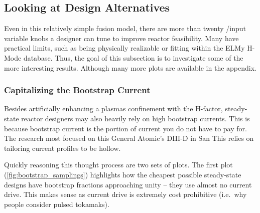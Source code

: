 \subsection{Looking at Design Alternatives}

Even in this relatively simple fusion model, there are more than twenty /input variable knobs a designer can tune to improve reactor feasibility. Many have practical limits, such as being physically realizable or fitting within the ELMy H-Mode database. Thus, the goal of this subsection is to investigate some of the more interesting results. Although many more plots are available in the appendix.

\subsubsection{Capitalizing the Bootstrap Current}

Besides artificially enhancing a plasmas confinement with the H-factor, steady-state reactor designers may also heavily rely on high bootstrap currents. This is because bootstrap current is the portion of current you do not have to pay for. The research  most focused on this  General Atomic's DIII-D in San  This  relies on tailoring current profiles to be  hollow.

Quickly reasoning this  thought process are two sets of plots. The first plot (\cref{fig:bootstrap_samplings}) highlights how the cheapest possible steady-state designs have bootstrap fractions approaching unity -- they use almost no current drive. This makes sense as current drive is extremely cost prohibitive (i.e.\ why people consider pulsed tokamaks).

